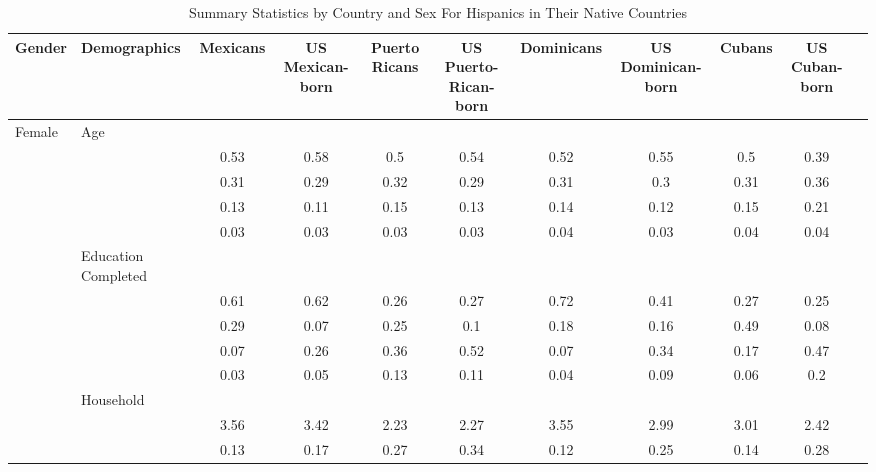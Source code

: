 \begin{table}[ht]
\centering
\caption{Summary Statistics by Country and Sex For Hispanics in Their Native Countries} 
\begingroup\small
\begin{tabular}{l>{\raggedright\arraybackslash}p{3.2cm}|ccccccccc}
  \hline
Gender & Demographics & Mexicans & US Mexican-born & Puerto Ricans & US Puerto-Rican-born & Dominicans & US Dominican-born & Cubans & US Cuban-born \\ 
  \hline
Female & Age &  &  &  &  &  &  &  &  \\ 
   & \multicolumn{1}{>{\raggedleft\arraybackslash}p{1.5cm}|}{\makebox[1.5cm][r]{60 - 69 }} & 0.53 & 0.58 & 0.5 & 0.54 & 0.52 & 0.55 & 0.5 & 0.39 \\ 
   & \multicolumn{1}{>{\raggedleft\arraybackslash}p{1.5cm}|}{\makebox[1.5cm][r]{70 - 79 }} & 0.31 & 0.29 & 0.32 & 0.29 & 0.31 & 0.3 & 0.31 & 0.36 \\ 
   & \multicolumn{1}{>{\raggedleft\arraybackslash}p{1.5cm}|}{\makebox[1.5cm][r]{80 - 89 }} & 0.13 & 0.11 & 0.15 & 0.13 & 0.14 & 0.12 & 0.15 & 0.21 \\ 
   & \multicolumn{1}{>{\raggedleft\arraybackslash}p{1.5cm}|}{\makebox[1.5cm][r]{90 plus }} & 0.03 & 0.03 & 0.03 & 0.03 & 0.04 & 0.03 & 0.04 & 0.04 \\ 
   & Education Completed &  &  &  &  &  &  &  &  \\ 
   & \multicolumn{1}{>{\raggedleft\arraybackslash}p{3.2cm}|}{\makebox[3.2cm][r]{Less than Primary }} & 0.61 & 0.62 & 0.26 & 0.27 & 0.72 & 0.41 & 0.27 & 0.25 \\ 
   & \multicolumn{1}{>{\raggedleft\arraybackslash}p{1.7cm}|}{\makebox[1.7cm][r]{Primary }} & 0.29 & 0.07 & 0.25 & 0.1 & 0.18 & 0.16 & 0.49 & 0.08 \\ 
   & \multicolumn{1}{>{\raggedleft\arraybackslash}p{2cm}|}{\makebox[2cm][r]{Secondary }} & 0.07 & 0.26 & 0.36 & 0.52 & 0.07 & 0.34 & 0.17 & 0.47 \\ 
   & \multicolumn{1}{>{\raggedleft\arraybackslash}p{2cm}|}{\makebox[2cm][r]{University }} & 0.03 & 0.05 & 0.13 & 0.11 & 0.04 & 0.09 & 0.06 & 0.2 \\ 
   & Household &  &  &  &  &  &  &  &  \\ 
   & \multicolumn{1}{>{\raggedleft\arraybackslash}p{2.7cm}|}{\makebox[2.7cm][r]{Household Size }} & 3.56 & 3.42 & 2.23 & 2.27 & 3.55 & 2.99 & 3.01 & 2.42 \\ 
   & \multicolumn{1}{>{\raggedleft\arraybackslash}p{2.2cm}|}{\makebox[2.2cm][r]{Lives Alone }} & 0.13 & 0.17 & 0.27 & 0.34 & 0.12 & 0.25 & 0.14 & 0.28 \\ 

\end{tabular}
\end{table}

